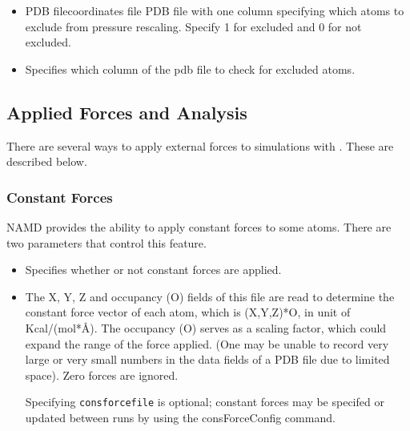 \begin{itemize}
\item
{}
{PDB file}{coordinates file}
{PDB file with one column specifying which atoms to exclude from pressure
rescaling.  Specify 1 for excluded and 0 for not excluded.}

\item
{}
{Specifies which column of the pdb file to check for excluded atoms.}

\end{itemize}

\subsection{Applied Forces and Analysis}

There are several ways to apply external forces to simulations with \NAMD.
These are described below.


\subsubsection{Constant Forces}

NAMD provides the ability to apply constant forces to some atoms.
There are two parameters that control this feature.

\begin{itemize}

\item
{}
{Specifies whether or not constant forces are applied.}

\item
{}
{
The X, Y, Z and occupancy (O) fields of this file are read to
determine the constant force vector of each atom, which is
(X,Y,Z)*O, in unit of Kcal/(mol*\AA). The occupancy (O) serves as
a scaling factor, which could expand the range of the force
applied. (One may be unable to record very large or very small
numbers in the data fields of a PDB file due to limited space).
Zero forces are ignored.

Specifying {\tt consforcefile} is optional; constant forces may be specifed
or updated between runs by using the consForceConfig command.
}

\end{itemize}


